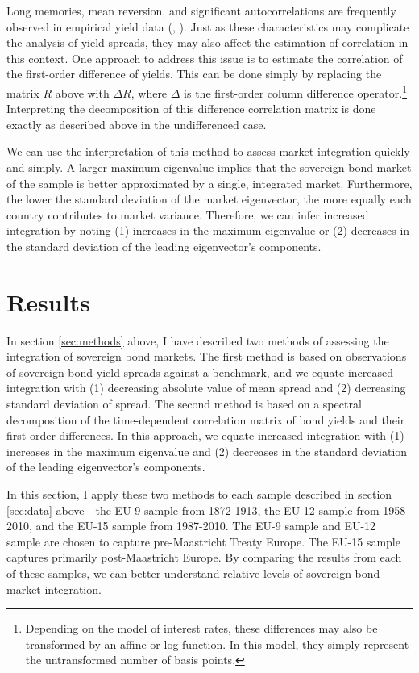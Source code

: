 \documentclass[3p]{elsarticle}
\begin{document}
Long memories, mean reversion, and significant autocorrelations are frequently observed in empirical yield data (\cite{Baillie1996}, \cite{Mccarthy2004}).  Just as these characteristics may complicate the analysis of yield spreads, they may also affect the estimation of correlation in this context.  One approach to address this issue is to estimate the correlation of the first-order difference of yields.  This can be done simply by replacing the matrix $R$ above with $\Delta R$, where $\Delta$ is the first-order column difference operator.\footnote{Depending on the model of interest rates, these differences may also be transformed by an affine or log function.  In this model, they simply represent the untransformed number of basis points.}  Interpreting the decomposition of this difference correlation matrix is done exactly as described above in the undifferenced case.

We can use the interpretation of this method to assess market integration quickly and simply. A larger maximum eigenvalue implies that the sovereign bond market of the sample is better approximated by a single, integrated market.  Furthermore, the lower the standard deviation of the market eigenvector, the more equally each country contributes to market variance.  Therefore, we can infer increased integration by noting (1) increases in the maximum eigenvalue or (2) decreases in the standard deviation of the leading eigenvector's components.

\section{Results}
\label{sec:results}
In section \ref{sec:methods} above, I have described two methods of assessing the integration of sovereign bond markets.  The first method is based on observations of sovereign bond yield spreads against a benchmark, and we equate increased integration with (1) decreasing absolute value of mean spread and (2) decreasing standard deviation of spread.  The second method is based on a spectral decomposition of the time-dependent correlation matrix of bond yields and their first-order differences.  In this approach, we equate increased integration with (1) increases in the maximum eigenvalue and (2) decreases in the standard deviation of the leading eigenvector's components.

In this section, I apply these two methods to each sample described in section \ref{sec:data} above - the EU-9 sample from 1872-1913, the EU-12 sample from 1958-2010, and the EU-15 sample from 1987-2010.  The EU-9 sample and EU-12 sample are chosen to capture pre-Maastricht Treaty Europe.  The EU-15 sample captures primarily post-Maastricht Europe.  By comparing the results from each of these samples, we can better understand relative levels of sovereign bond market integration.
\end{document}
